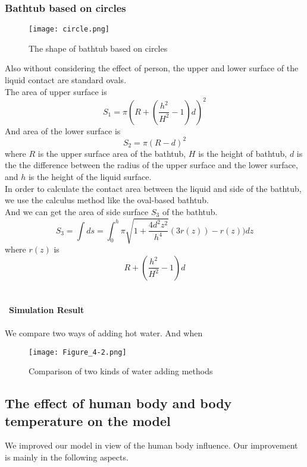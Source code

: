 \documentclass{mcmthesis}
\begin{document}
\subsubsection{Bathtub based on circles}
\begin{figure}[H]
\centerline{\texttt{[image: circle.png]}}
\caption{The shape of bathtub based on circles}
\label{circle}	
\end{figure}
\indent Also without considering the effect of person, the upper and lower surface of the liquid contact are standard ovals.\\
\indent The area of upper surface is\\
\begin{equation}
S_{1}=\pi (R+(\frac{h^{2}}{H^{2}}-1)d)^{2}
\end{equation}
\indent And area of the lower surface is\\
\begin{equation}
S_{2}=\pi (R-d)^{2}
\end{equation}
\indent where $R$ is the upper surface area of the bathtub, $H$ is the height of bathtub, $d$ is the the difference between the radius of the upper surface and the lower surface, and $h$ is the height of the liquid surface.\\ 
\indent In order to calculate the contact area between the liquid and side of the bathtub, we use the calculus method like the oval-based bathtub.\\
And we can get the area of side surface $S_{3}$ of the bathtub.
\begin{equation}
	S_{3}=\int ds=\int_{0}^{h}\pi \sqrt{1+\frac{4d^{2}z^{2}}{h^{4}}}({3}r(z))-r(z))dz
\end{equation}
\indent where $r(z)$ is
\begin{equation}
	R+(\frac{h^{2}}{H^{2}}-1)d
\end{equation}
\\\\
\noindent\
\textbf{Simulation Result}\\\\
\indent We compare two ways of adding hot water. And when  
\begin{figure}[H]
	\centerline{\texttt{[image: Figure\_4-2.png]}}
	\caption{Comparison of two kinds of water adding methods}
	\label{circle}	
\end{figure}

\subsection{The effect of human body and body temperature on the model}
We improved our model in view of the human body influence. Our improvement is mainly in the following aspects.
\end{document}
